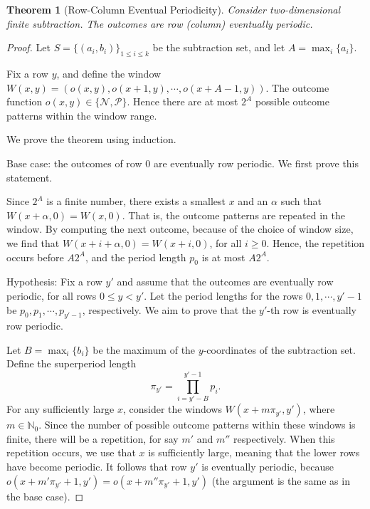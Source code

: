 \documentclass{amsart}
\theoremstyle{plain}
\newtheorem{thm}{Theorem}%
\theoremstyle{definition}
\newtheorem{defi}[thm]{Definition}
\newcommand{\N}{\ensuremath{\mathcal N}}
\renewcommand{\P}{\ensuremath{\mathcal P}}
\newcommand{\nz}{\mathbb N_0}
\renewcommand{\ge}{\geqslant}
\renewcommand{\le}{\leqslant}
\begin{document}
\begin{thm}[Row-Column Eventual Periodicity]
\label{thm:rowperiod2d}
Consider {\sc two-dimensional finite subtraction}. The outcomes are row (column) eventually periodic.
\end{thm}
\begin{proof}
Let $S=\{(a_i,b_i)\}_{1\le i \le k}$ be the subtraction set, and let $A=\max_{i} \{a_i\}$.

Fix a row $y$, and define the window $W(x,y) = (o(x,y), o(x+1,y), \cdots , o(x+A-1,y))$. The outcome function $o(x,y) \in \{\N, \P\}$. Hence there are at most $2^A$ possible outcome patterns within the window range. 

We prove the theorem using induction.  

Base case: the outcomes of row $0$  are eventually row periodic. We first prove this statement. 

Since $2^A$ is a finite number, there exists a smallest $x$ and an $\alpha$ such that $W(x+\alpha,0) = W(x,0)$. 
That is, the outcome patterns are repeated in the window. By computing the next outcome, because of the choice of window size, we find that $W(x+i+\alpha,0) = W(x+i,0)$, for all $i\ge 0$. Hence, the repetition occurs before $A 2^A$, and the period length $p_0$ is at most $A2^A$.



Hypothesis: Fix a row $y'$ and assume that the outcomes are eventually row periodic, for all rows $0\le y < y'$.
Let the period lengths for the rows $0, 1, \cdots, y'-1$ be  $p_0, p_1, \cdots, p_{y'-1}$, respectively.  We aim to prove that the $y'$-th row is eventually row periodic. 

Let $B=\max_{i} \{b_i\}$ be the maximum of the $y$-coordinates of the subtraction set. Define the superperiod length 
\begin{equation}
\label{eq:superperiod}
\pi_{y'} = \prod_{i=y'-B}^{y'-1}p_i.
\end{equation}
For any sufficiently large $x$, consider the windows $W(x+m\pi_{y'},y')$, where $m \in \nz$. Since the number of possible outcome patterns within these windows is finite, there will be a repetition, for say $m'$ and $m''$ respectively. When this repetition occurs, we use that $x$ is sufficiently large, meaning that the lower rows have become periodic. It follows that row $y'$ is eventually periodic, because $o(x+m'\pi_{y'}+1,y')=o(x+m''\pi_{y'}+1,y')$ (the argument is the same as in the base case). 
\end{proof}
\end{document}
